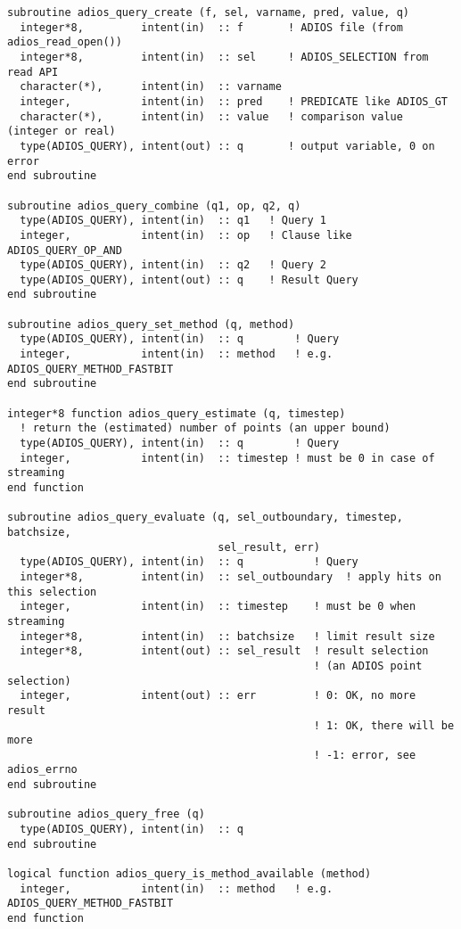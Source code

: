 \begin{lstlisting}[language=ADIOS,alsolanguage=Fortran]
subroutine adios_query_create (f, sel, varname, pred, value, q)
  integer*8,         intent(in)  :: f       ! ADIOS file (from adios_read_open())
  integer*8,         intent(in)  :: sel     ! ADIOS_SELECTION from read API
  character(*),      intent(in)  :: varname
  integer,           intent(in)  :: pred    ! PREDICATE like ADIOS_GT
  character(*),      intent(in)  :: value   ! comparison value (integer or real)
  type(ADIOS_QUERY), intent(out) :: q       ! output variable, 0 on error
end subroutine

subroutine adios_query_combine (q1, op, q2, q)
  type(ADIOS_QUERY), intent(in)  :: q1   ! Query 1
  integer,           intent(in)  :: op   ! Clause like ADIOS_QUERY_OP_AND
  type(ADIOS_QUERY), intent(in)  :: q2   ! Query 2
  type(ADIOS_QUERY), intent(out) :: q    ! Result Query 
end subroutine

subroutine adios_query_set_method (q, method)
  type(ADIOS_QUERY), intent(in)  :: q        ! Query 
  integer,           intent(in)  :: method   ! e.g. ADIOS_QUERY_METHOD_FASTBIT
end subroutine

integer*8 function adios_query_estimate (q, timestep)
  ! return the (estimated) number of points (an upper bound)
  type(ADIOS_QUERY), intent(in)  :: q        ! Query 
  integer,           intent(in)  :: timestep ! must be 0 in case of streaming
end function

subroutine adios_query_evaluate (q, sel_outboundary, timestep, batchsize, 
                                 sel_result, err)
  type(ADIOS_QUERY), intent(in)  :: q           ! Query 
  integer*8,         intent(in)  :: sel_outboundary  ! apply hits on this selection
  integer,           intent(in)  :: timestep    ! must be 0 when streaming
  integer*8,         intent(in)  :: batchsize   ! limit result size 
  integer*8,         intent(out) :: sel_result  ! result selection 
                                                ! (an ADIOS point selection)
  integer,           intent(out) :: err         ! 0: OK, no more result
                                                ! 1: OK, there will be more
                                                ! -1: error, see adios_errno
end subroutine

subroutine adios_query_free (q)
  type(ADIOS_QUERY), intent(in)  :: q
end subroutine

logical function adios_query_is_method_available (method)
  integer,           intent(in)  :: method   ! e.g. ADIOS_QUERY_METHOD_FASTBIT
end function
\end{lstlisting}




